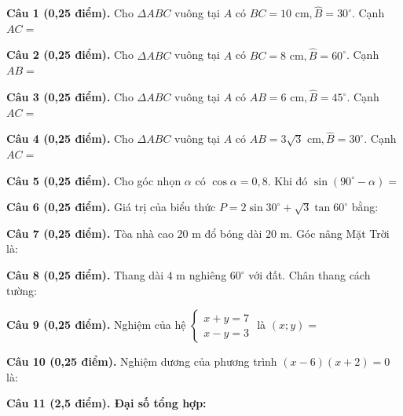 \documentclass[12pt,a4paper]{article}
\begin{document}
\vspace{1.2mm}
\noindent\textbf{Câu 1 (0,25 điểm).} Cho $\Delta ABC$ vuông tại $A$ có $BC = 10\text{ cm}, \widehat{B} = 30^\circ$. Cạnh $AC =$ \par\vspace{0.6mm}
\noindent\textbf{Câu 2 (0,25 điểm).} Cho $\Delta ABC$ vuông tại $A$ có $BC = 8\text{ cm}, \widehat{B} = 60^\circ$. Cạnh $AB =$ \par\vspace{0.6mm}
\noindent\textbf{Câu 3 (0,25 điểm).} Cho $\Delta ABC$ vuông tại $A$ có $AB = 6\text{ cm}, \widehat{B} = 45^\circ$. Cạnh $AC =$ \par\vspace{0.6mm}
\noindent\textbf{Câu 4 (0,25 điểm).} Cho $\Delta ABC$ vuông tại $A$ có $AB = 3\sqrt{3}\text{ cm}, \widehat{B} = 30^\circ$. Cạnh $AC =$ \par\vspace{0.6mm}
\noindent\textbf{Câu 5 (0,25 điểm).} Cho góc nhọn $\alpha$ có $\cos \alpha = 0{,}8$. Khi đó $\sin(90^\circ - \alpha) =$ \par\vspace{0.6mm}
\noindent\textbf{Câu 6 (0,25 điểm).} Giá trị của biểu thức $P = 2\sin 30^\circ + \sqrt{3}\tan 60^\circ$ bằng: \par\vspace{0.6mm}
\noindent\textbf{Câu 7 (0,25 điểm).} Tòa nhà cao $20\text{ m}$ đổ bóng dài $20\text{ m}$. Góc nâng Mặt Trời là: \par\vspace{0.6mm}
\noindent\textbf{Câu 8 (0,25 điểm).} Thang dài $4\text{ m}$ nghiêng $60^\circ$ với đất. Chân thang cách tường: \par\vspace{0.6mm}
\noindent\textbf{Câu 9 (0,25 điểm).} Nghiệm của hệ $\begin{cases} x + y = 7 \\ x - y = 3 \end{cases}$ là $(x; y) =$ \par\vspace{0.6mm}
\noindent\textbf{Câu 10 (0,25 điểm).} Nghiệm dương của phương trình $(x - 6)(x + 2) = 0$ là: \par\vspace{0.6mm}
\vspace{0.8mm}
\noindent\textbf{Câu 11 (2,5 điểm). Đại số tổng hợp:}
\vspace{0.6mm}
\end{document}
